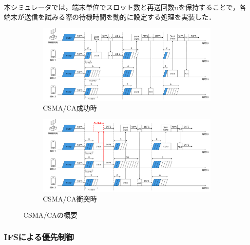 \documentclass[a4paper, 10pt]{ltjsarticle}
\begin{document}

本シミュレータでは，端末単位でスロット数と再送回数$n$を保持することで，各端末が送信を試みる際の待機時間を動的に設定する処理を実装した．


\begin{figure}[htbp]
  \centering

  \begin{subfigure}{\columnwidth}
    \centering
    \includegraphics[width=1\columnwidth]{./assets/csma-ca-s.png}
    \caption{CSMA/CA成功時}
    \label{1a}
  \end{subfigure}


  \begin{subfigure}{\columnwidth}
    \centering
    \includegraphics[width=1\columnwidth]{./assets/csma-ca-f.png}
    \caption{CSMA/CA衝突時}
    \label{1b}
  \end{subfigure}


  \caption{CSMA/CAの概要}
  \label{CSMA/CA}
\end{figure}

\vspace{-3em}

\subsubsection{IFSによる優先制御}
\end{document}
